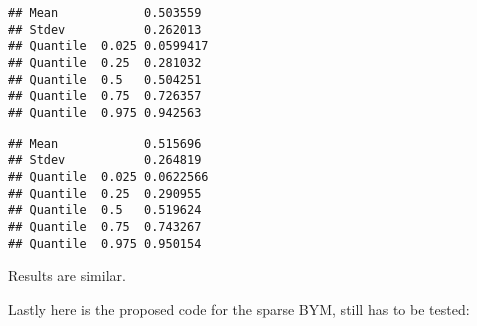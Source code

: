 \documentclass[
]{article}
\newenvironment{Shaded}{\begin{snugshade}}{\end{snugshade}}
\newcommand{\AttributeTok}[1]{\textcolor[rgb]{0.13,0.29,0.53}{#1}}
\newcommand{\CommentTok}[1]{\textcolor[rgb]{0.56,0.35,0.01}{\textit{#1}}}
\newcommand{\ControlFlowTok}[1]{\textcolor[rgb]{0.13,0.29,0.53}{\textbf{#1}}}
\newcommand{\DecValTok}[1]{\textcolor[rgb]{0.00,0.00,0.81}{#1}}
\newcommand{\FunctionTok}[1]{\textcolor[rgb]{0.13,0.29,0.53}{\textbf{#1}}}
\newcommand{\NormalTok}[1]{#1}
\newcommand{\SpecialCharTok}[1]{\textcolor[rgb]{0.81,0.36,0.00}{\textbf{#1}}}
\begin{document}
\begin{verbatim}
## Mean            0.503559 
## Stdev           0.262013 
## Quantile  0.025 0.0599417 
## Quantile  0.25  0.281032 
## Quantile  0.5   0.504251 
## Quantile  0.75  0.726357 
## Quantile  0.975 0.942563
\end{verbatim}

\begin{Shaded}
\end{Shaded}

\begin{verbatim}
## Mean            0.515696 
## Stdev           0.264819 
## Quantile  0.025 0.0622566 
## Quantile  0.25  0.290955 
## Quantile  0.5   0.519624 
## Quantile  0.75  0.743267 
## Quantile  0.975 0.950154
\end{verbatim}

Results are similar.

Lastly here is the proposed code for the sparse BYM, still has to be
tested:
\end{document}
